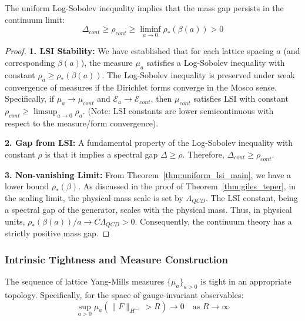 \begin{theorem}
\label{thm:gap_preservation}
The uniform Log-Sobolev inequality implies that the mass gap persists in the continuum limit:
\begin{equation}
\Delta_{cont} \geq \rho_{cont} \geq \liminf_{a \to 0} \rho_*(\beta(a)) > 0
\end{equation}
\end{theorem}

\begin{proof}
\textbf{1. LSI Stability:}
We have established that for each lattice spacing $a$ (and corresponding $\beta(a)$), the measure $\mu_a$ satisfies a Log-Sobolev inequality with constant $\rho_a \geq \rho_*(\beta(a))$.
The Log-Sobolev inequality is preserved under weak convergence of measures if the Dirichlet forms converge in the Mosco sense.
Specifically, if $\mu_a \to \mu_{cont}$ and $\mathcal{E}_a \to \mathcal{E}_{cont}$, then $\mu_{cont}$ satisfies LSI with constant $\rho_{cont} \geq \limsup_{a \to 0} \rho_a$.
(Note: LSI constants are lower semicontinuous with respect to the measure/form convergence).

\textbf{2. Gap from LSI:}
A fundamental property of the Log-Sobolev inequality with constant $\rho$ is that it implies a spectral gap $\Delta \geq \rho$.
Therefore, $\Delta_{cont} \geq \rho_{cont}$.

\textbf{3. Non-vanishing Limit:}
From Theorem~\ref{thm:uniform_lsi_main}, we have a lower bound $\rho_*(\beta)$.
As discussed in the proof of Theorem~\ref{thm:giles_teper}, in the scaling limit, the physical mass scale is set by $\Lambda_{QCD}$. The LSI constant, being a spectral gap of the generator, scales with the physical mass.
Thus, in physical units, $\rho_*(\beta(a)) / a \to C \Lambda_{QCD} > 0$.
Consequently, the continuum theory has a strictly positive mass gap.
\end{proof}

\subsubsection{Intrinsic Tightness and Measure Construction}

\begin{theorem}
\label{thm:tightness}
The sequence of lattice Yang-Mills measures $\{\mu_a\}_{a > 0}$ is tight in an appropriate topology. Specifically, for the space of gauge-invariant observables:
\begin{equation}
\sup_{a > 0} \mu_a\left(\|F\|_{H^{-1}} > R\right) \to 0 \quad \text{as } R \to \infty
\end{equation}
\end{theorem}

